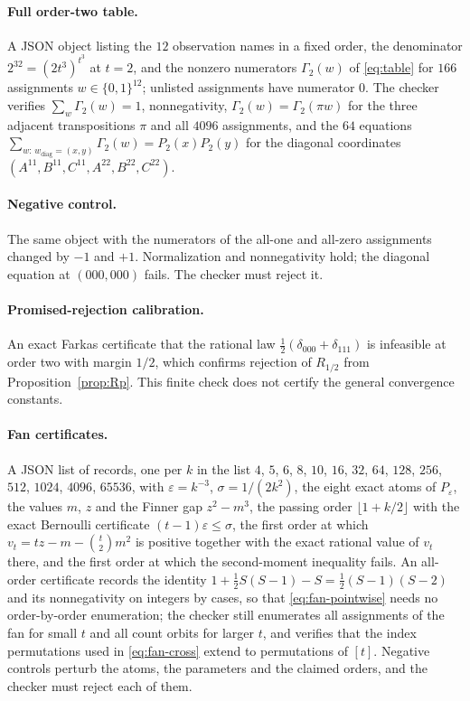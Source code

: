 \documentclass[11pt]{article}
\theoremstyle{plain}
\theoremstyle{definition}
\newcommand{\eps}{\varepsilon}
\begin{document}
\paragraph{Full order-two table.}
A JSON object listing the $12$ observation names in a fixed order, the denominator $2^{32}=(2t^3)^{t^3}$ at $t=2$, and the nonzero numerators $\Gamma_2(w)$ of \eqref{eq:table} for $166$ assignments $w\in\{0,1\}^{12}$; unlisted assignments have numerator $0$. The checker verifies $\sum_w\Gamma_2(w)=1$, nonnegativity, $\Gamma_2(w)=\Gamma_2(\pi w)$ for the three adjacent transpositions $\pi$ and all $4096$ assignments, and the $64$ equations $\sum_{w:\,w_{\mathrm{diag}}=(x,y)}\Gamma_2(w)=P_2(x)P_2(y)$ for the diagonal coordinates $(A^{11},B^{11},C^{11},A^{22},B^{22},C^{22})$.

\paragraph{Negative control.}
The same object with the numerators of the all-one and all-zero assignments changed by $-1$ and $+1$. Normalization and nonnegativity hold; the diagonal equation at $(000,000)$ fails. The checker must reject it.

\paragraph{Promised-rejection calibration.}
An exact Farkas certificate that the rational law $\tfrac12(\delta_{000}+\delta_{111})$ is infeasible at order two with margin $1/2$, which confirms rejection of $R_{1/2}$ from Proposition~\ref{prop:Rp}. This finite check does not certify the general convergence constants.

\paragraph{Fan certificates.}
A JSON list of records, one per $k$ in the list $4$, $5$, $6$, $8$, $10$, $16$, $32$, $64$, $128$, $256$, $512$, $1024$, $4096$, $65536$, with $\eps=k^{-3}$, $\sigma=1/(2k^2)$, the eight exact atoms of $P_\eps$, the values $m$, $z$ and the Finner gap $z^2-m^3$, the passing order $\lfloor1+k/2\rfloor$ with the exact Bernoulli certificate $(t-1)\eps\le\sigma$, the first order at which $v_t=tz-m-\binom t2m^2$ is positive together with the exact rational value of $v_t$ there, and the first order at which the second-moment inequality fails. An all-order certificate records the identity $1+\tfrac12S(S-1)-S=\tfrac12(S-1)(S-2)$ and its nonnegativity on integers by cases, so that \eqref{eq:fan-pointwise} needs no order-by-order enumeration; the checker still enumerates all assignments of the fan for small $t$ and all count orbits for larger $t$, and verifies that the index permutations used in \eqref{eq:fan-cross} extend to permutations of $[t]$. Negative controls perturb the atoms, the parameters and the claimed orders, and the checker must reject each of them.
\end{document}
